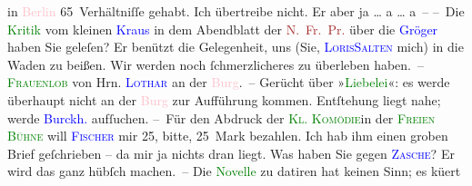                   \introOben{}in \textcolor{pink}{Berlin}{}\ledrightnote{\textcolor{pink}{Berlin}}\introOben{} 65 Verhältniſſe gehabt. Ich übertreibe nicht. Er aber ja {\dots} a {\dots} a –\pend
           \pstart
           – Die \textcolor{green}{Kritik}{} vom kleinen \textcolor{blue}{Kraus}{}\ledrightnote{\textcolor{blue}{Karl Kraus}} in dem {\pb}Abendblatt der
                  \textcolor{brown}{N. Fr. Pr.}{}\ledrightnote{\textcolor{brown}{Neue Freie Presse}} über die \textcolor{blue}{Gröger}{}\ledrightnote{\textcolor{blue}{Fanny Gröger}} haben Sie geleſen? Er benützt die Gelegenheit,
               uns (Sie, \textcolor{blue}{\textsc{Loris}}{}\ledrightnote{\textcolor{blue}{Hugo von Hofmannsthal}}{ }\introOben{}\textcolor{blue}{\textsc{Salten}}{}\ledrightnote{\textcolor{blue}{Felix Salten}}\introOben{} mich) in die Waden zu beißen.\strikeout{)} Wir werden
               noch ſchmerzlicheres zu überleben haben. –\pend
           \pstart
           \textcolor{green}{\textsc{Frauenlob}}{}\ledrightnote{\textcolor{green}{Frauenlob. Lustspiel in drei Aufzügen}} von Hrn. \textsc{\textcolor{blue}{Lothar}{}\ledrightnote{\textcolor{blue}{Rudolf Lothar}}} an der \textcolor{pink}{Burg}{}\ledrightnote{\textcolor{pink}{Burgtheater}}{ }\label{K_L00454_1v}\label{K_L00454_1h}. – Gerücht über
                  »\textcolor{green}{Liebelei}{}\ledrightnote{\textcolor{green}{Liebelei. Schauspiel in drei Akten}}«: es werde überhaupt nicht an der
                  \textcolor{pink}{Burg}{}\ledrightnote{\textcolor{pink}{Burgtheater}} zur Aufführung kommen. Entſtehung liegt
               nahe; werde \textcolor{blue}{Burckh.}{}\ledrightnote{\textcolor{blue}{Max Eugen Burckhard}} aufſuchen.\pend
           \pstart
           – Für den Abdruck der \textcolor{green}{\textsc{Kl. Komödie}}{}\ledrightnote{\textcolor{green}{Die kleine Komödie}}{ }{\pb}in
               der \textcolor{green}{\textsc{Freien Bühne}}{}\ledrightnote{\textcolor{green}{Neue Deutsche Rundschau}} will \textcolor{blue}{\textsc{Fischer}}{}\ledrightnote{\textcolor{blue}{Samuel Fischer}} mir 25, bitte, 25 Mark bezahlen. Ich hab ihm einen groben Brief
               geſchrieben – da mir ja nichts dran liegt. Was haben Sie gegen \textsc{\textcolor{blue}{Zasche}{}\ledrightnote{\textcolor{blue}{Theodor Zasche}}}? Er wird das ganz hübſch machen. – Die \textcolor{green}{Novelle}{} zu datiren hat keinen Sinn; es kü{\geminationm}ert

